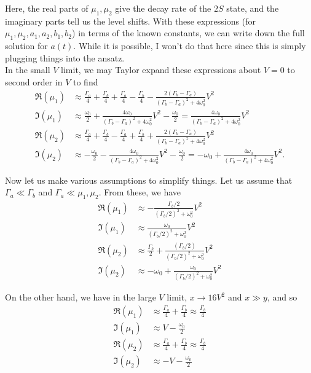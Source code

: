 \documentclass{article}
\theoremstyle{definition}
\newcommand{\f}[2]{\frac{#1}{#2}}
\begin{document}
\begin{enumerate}[label=(\alph*)]
	Here, the real parts of $\mu_1,\mu_2$ give the decay rate of the $2S$ state, and the imaginary parts tell us the level shifts. With these expressions (for $\mu_1,\mu_2,a_1,a_2,b_1,b_2$) in terms of the known constants, we can write down the full solution for $a(t)$. While it is possible, I won't do that here since this is  simply plugging things into the ansatz. \\
	
	
	In the small $V$ limit, we may Taylor expand these expressions about $V = 0$ to second order in $V$ to find 
	\begin{align*}
	\Re(\mu_1) 
	&\approx \f{\Gamma_a}{4} + \f{\Gamma_b}{4} + \f{\Gamma_a}{4} - \f{\Gamma_b}{4} - \f{2(\Gamma_b-\Gamma_a)}{(\Gamma_b-\Gamma_a)^2+4\omega_0^2}V^2\\
	\Im(\mu_1) &\approx  \f{\omega_0}{2} + \f{4\omega_0}{(\Gamma_b - \Gamma_a)^2+4\omega_0^2}V^2  - \f{\omega_0}{2} = \f{4\omega_0}{(\Gamma_b - \Gamma_a)^2+4\omega_0^2} V^2 \\
	\Re(\mu_2) &\approx \f{\Gamma_a}{4} + \f{\Gamma_b}{4} - \f{\Gamma_a}{4} + \f{\Gamma_b}{4} + \f{2(\Gamma_b-\Gamma_a)}{(\Gamma_b-\Gamma_a)^2+4\omega_0^2}V^2\\
	\Im(\mu_2) &\approx  -\f{\omega_0}{2} - \f{4\omega_0}{(\Gamma_b - \Gamma_a)^2+4\omega_0^2}V^2  - \f{\omega_0}{2} = -\omega_0 + \f{4\omega_0}{(\Gamma_b - \Gamma_a)^2+4\omega_0^2} V^2.
	\end{align*}
	
	Now let us make various assumptions to simplify things. Let us assume that $\Gamma_a \ll \Gamma_b$ and $\Gamma_a \ll \mu_1, \mu_2$. From these, we have
	\begin{align*}
	\Re(\mu_1) 
	&\approx  -  \f{  \Gamma_b/2}{(\Gamma_b/2)^2+\omega_0^2} V^2\\
	\Im(\mu_1) &\approx  \f{\omega_0}{(\Gamma_b/2 )^2+\omega_0^2} V^2  \\
	\Re(\mu_2) &\approx \f{\Gamma_b}{2} +\f{  (\Gamma_b/2)}{(\Gamma_b/2)^2+\omega_0^2} V^2 \\
	\Im(\mu_2) &\approx   -\omega_0 + \f{\omega_0}{(\Gamma_b/2 )^2+\omega_0^2} V^2  
	\end{align*}
	
	
	
	
	
	
	
	
	On the other hand, we have in the large $V$ limit, $x \to 16V^2$ and $x \gg y$, and so 
	\begin{align*}
	\Re(\mu_1) &\approx \f{\Gamma_a}{4} + \f{\Gamma_b}{4} \approx \f{\Gamma_b}{4}\\
	\Im(\mu_1) &\approx  V - \f{\omega_0}{2}\\
	\Re(\mu_2) &\approx \f{\Gamma_a}{4} + \f{\Gamma_b}{4} \approx \f{\Gamma_b}{4}\\
	\Im(\mu_2) &\approx  -V - \f{\omega_0}{2}
	\end{align*}
	

\end{enumerate}
\end{document}
